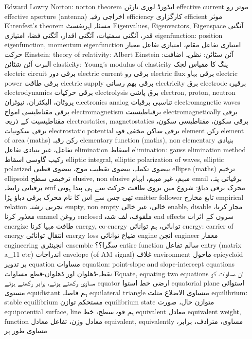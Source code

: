 Edward Lowry Norton: norton theorem	ایڈورڈ لوری نارٹن
effective current	موثر رو
effective aperture (antenna)	اخراجی رقبہ
efficiency	کارگزاری
efficient	موثر
Ehrenfest’s theorem	مسئلہ اہرنفسٹ
Eigenvalues, Eigenvectors, Eigenspace	آئگنی قدر، آئگنی سمتیات، آئگنی اقدار،  آئگنی فضا، امتیازی
eigenfunction: position eigenfunction, momentum eigenfunction	امتیازی تفاعل مقام، امتیازی تفاعل معیار حرکت
Einstein: theory of relativity: Albert Einstein	آئن سٹائن: نظریہ اضافت: البرت آئن شٹائن
elasticity: Young's modulus of elasticity	ینگ کا مقیاس لچک
electric circuit	برقی دور
electric current	برقی رو
electric flux	برقی بہاو
electric power	برقی طاقت
electric supply	برقی بھم رسانی
electricity	برق
electrode	برقیرہ
electrodynamics	برقی حرکیات
electrolysis	برق پاشی
electron, proton, neutron	پروٹان، الیکٹران، نیوٹران
electronics analog	تناسبی برقیات
electromagnetic waves	برقی مقناطیسی امواج
electromagnetism	برقناطیسیت
electromagnetically	برقی مقناطیسیت کے ذریعہ
electrostatics, magnetostatics	برقی سکون، مقناطیسی سکون، برقی سکونیات
electrostatic potential	برقی ساکن مخفی قوہ
element	رکن
element of area (maths)	رکن رقبہ
elementary function (maths), non elementary	بنیادی تفاعل، غیر بنیادی تفاعل
elimination	اسقاط
elimination: gauss elimination method	رکیب گاوسی اسقاط
elliptic integral, elliptic polarization of waves, elliptic polarized	بیضوی تکملہ، بیضوی تقطیب موج، بیضوی قطبی
ellipse (maths)	ترخیم
ellipsoid	ترخیمی سطح
elusive, non elusive	مبہم، غیر مبہم، ابہام
email	برقیاتی پتہ، برقیاتی رابطہ
emf	محرک برقی دباؤ: شروع میں بروی طاقت حرکت سے ہی پیدا ہوتی تھی جس سے اس کا نام محرک برقی دباؤ پڑا
emitter follower	تابع مخارج
empirical relation	تجربی رشتہ
empty, non empty	خالی، غیر خالی
enable, disable	مجاز کرنا، معذور کرنا
enamel	روغن
enclosed	ملفوف، لف شدہ
end effects	سروں کے اثرات
energize	طاقت مہیا کرنا
energy, co-energy	توانائی، ہم توانائی
energy: carrier of energy	انتقالِ توانائی
energy loss	ضیاع توانائی
engine	انجن
engineer	معمار
engineering	انجینئری
ensemble	سگرا؟؟
entire function	سالم تفاعل
entry (matrix a_11 etc)	اندراجات
envelope (of AM signal)	غلاف
environment	ماحول
epicycloid	بر تدویر
equation	مساوات
equation: point-slope and slope-intercept equations	نقطہ-ڈھلوان اور ڈھلوان-قطع مساوات
Equate, equating two equations	ان مساوات کو مساوی رکھتے ہوئے، برابر رکھتے ہوئے
equator	ارضی خط استوا
equatorial plane	استوائی مستوی
equidistant	ہم فاصلہ
equilateral triangle	متساوی الاضلاع مثلث
equilibrium: stable equilibrium	مستحکم توازن
equilibrium state	متوازن حال، صورت
equipotential surface, line	ہم قوہ سطح، خط
equivalent	معادل
equivalent weight, function	معادل وزن، تفاعل معادل
equivalent, equivalently	مساوی، مترادف، برابر، مساوی طور پر
